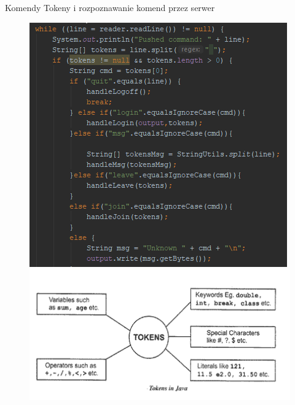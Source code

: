 \documentclass{beamer}
\begin{document}
\begin{frame}{Komendy}
 Tokeny i rozpoznawanie komend przez serwer
\begin{figure}
 \centering
  \begin{minipage}[b]{0.5\textwidth}
\includegraphics[width=\textwidth,left]{server_command}
\end{minipage}
  \hfill
  \begin{minipage}[b]{0.5\textwidth}
\includegraphics[width=\textwidth,right]{tokens}
 \end{minipage}
\end{figure}
\end{frame}
\end{document}
